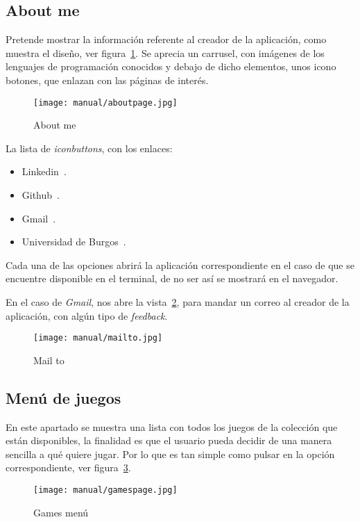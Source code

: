 \subsection{About me}\label{about}
Pretende mostrar la información referente al creador de la aplicación, como muestra el diseño, ver figura~\ref{fig:aboutpage}. Se aprecia un carrusel, con imágenes de los lenguajes de programación conocidos y debajo de dicho elementos, unos icono botones, que enlazan con las páginas de interés.

\begin{figure}[H]
	\centering
	\texttt{[image: manual/aboutpage.jpg]}
	\caption{About me}\label{fig:aboutpage}
\end{figure}

La lista de \emph{iconbuttons}, con los enlaces:
\begin{itemize}
	\item Linkedin~\cite{linkedin:cuenta}.
	\item Github~\cite{github:repo}.
	\item Gmail~\cite{mailto:mailto}.
	\item Universidad de Burgos~\cite{ubu:page}.
\end{itemize}

Cada una de las opciones abrirá la aplicación correspondiente en el caso de que se encuentre disponible en el terminal, de no ser así se mostrará en el navegador.

En el caso de \emph{Gmail}, nos abre la vista~\ref{fig:mailto}, para mandar un correo al creador de la aplicación, con algún tipo de \emph{feedback}.

\begin{figure}[H]
	\centering
	\texttt{[image: manual/mailto.jpg]}
	\caption{Mail to}\label{fig:mailto}
\end{figure}

\subsection{Menú de juegos}\label{menugames}
En este apartado se muestra una lista con todos los juegos de la colección que están disponibles, la finalidad es que el usuario pueda decidir de una manera sencilla a qué quiere jugar. Por lo que es tan simple como pulsar en la opción correspondiente, ver figura~\ref{fig:gamespage}.

\begin{figure}[H]
	\centering
	\texttt{[image: manual/gamespage.jpg]}
	\caption{Games menú}\label{fig:gamespage}
\end{figure}

